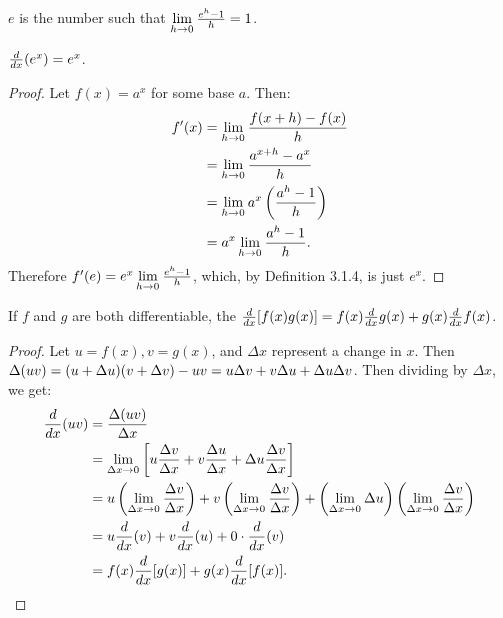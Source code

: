\documentclass[a4paper,11pt]{article}
\begin{document}
\begin{outline}
    \(e\) is the number such that \(\lim\limits_{h\rightarrow 0^{}}\frac{e^h-1}{h} = 1\).
    
    \(\frac{d}{dx}(e^x) = e^x\).
    
    \begin{proof}
      Let \(f(x) = a^x\) for some base \(a\). Then:
      \begin{align*}
        f'(x) &= \lim\limits_{h\rightarrow 0^{}}\frac{f(x+h)-f(x)}{h} \\
              &= \lim\limits_{h\rightarrow 0^{}}\frac{a^{x+h}-a^x}{h} \\
              &= \lim\limits_{h\rightarrow 0^{}}a^x\left(\frac{a^h-1}{h}\right)  \\
              &= a^x\lim\limits_{h\rightarrow 0^{}}\frac{a^h-1}{h}\text{.}
      \end{align*}
      Therefore \(f'(e) = e^x\lim\limits_{h\rightarrow 0^{}}\frac{e^h-1}{h}\), which, by Definition 3.1.4, is just \(e^x\).
    \end{proof}

    If \(f\) and \(g\) are both differentiable, the \(\frac{d}{dx}[f(x)g(x)] = f(x)\frac{d}{dx}g(x) + g(x)\frac{d}{dx}f(x)\).
    
    \begin{proof}
      Let \(u = f(x), v = g(x)\), and \(\Delta x\) represent a change in \(x\). Then \(\Delta(uv) = (u + \Delta u)
      (v + \Delta v) - uv = u\Delta v + v\Delta u + \Delta u\Delta v\). Then dividing by \(\Delta x\), we get:
      \begin{align*}
        \frac{d}{dx}(uv) &= \frac{\Delta(uv)}{\Delta x}\\
                        &= \lim\limits_{\Delta x\rightarrow 0^{}}\left[u\frac{\Delta v}{\Delta x} + v\frac{\Delta u}{\Delta x} + \Delta u
                            \frac{\Delta v}{\Delta x}\right] \\
                        &= u\left(\lim\limits_{\Delta x\rightarrow 0^{}}\frac{\Delta v}{\Delta x}\right) + 
                           v\left(\lim\limits_{\Delta x\rightarrow 0^{}}\frac{\Delta v}{\Delta x}\right) + 
                           \left(\lim\limits_{\Delta x\rightarrow 0^{}}\Delta u\right)
                           \left(\lim\limits_{\Delta x\rightarrow 0^{}}\frac{\Delta v}{\Delta x}\right)\\
                        &= u\frac{d}{dx}(v) + v\frac{d}{dx}(u) + 0 \cdot \frac{d}{dx}(v)\\
                        &= f(x)\frac{d}{dx}[g(x)] + g(x)\frac{d}{dx}[f(x)]\text{.}
      \end{align*}
    \end{proof}
    

\end{outline}
\end{document}
